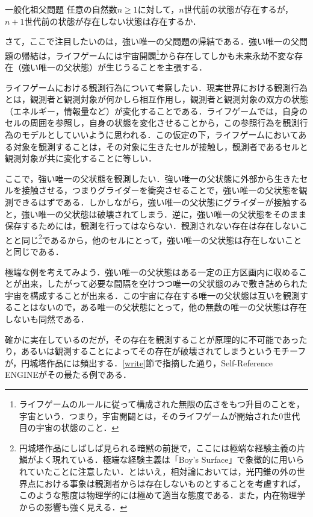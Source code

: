 \documentclass[10pt, a5paper, twoside]{ltjsarticle}
\begin{document}
            \begin{prb}{一般化祖父問題}{}
                任意の自然数$n \geq 1$に対して，$n$世代前の状態が存在するが，$n+1$世代前の状態が存在しない状態は存在するか．
            \end{prb}

            さて，ここで注目したいのは，強い唯一の父問題の帰結である．強い唯一の父問題の帰結は，ライフゲームには宇宙開闢\footnote{ライフゲームのルールに従って構成された無限の広さをもつ升目のことを，宇宙という．つまり，宇宙開闢とは，そのライフゲームが開始された0世代目の宇宙の状態のこと．}から存在してしかも未来永劫不変な存在（強い唯一の父状態）が生じうることを主張する．

            ライフゲームにおける観測行為について考察したい．現実世界における観測行為とは，観測者と観測対象が何かしら相互作用し，観測者と観測対象の双方の状態（エネルギー，情報量など）が変化することである．ライフゲームでは，自身のセルの周囲を参照し，自身の状態を変化させることから，この参照行為を観測行為のモデルとしていいように思われる．この仮定の下，ライフゲームにおいてある対象を観測することは，その対象に生きたセルが接触し，観測者であるセルと観測対象が共に変化することに等しい．

            ここで，強い唯一の父状態を観測したい．強い唯一の父状態に外部から生きたセルを接触させる，つまりグライダーを衝突させることで，強い唯一の父状態を観測できるはずである．しかしながら，強い唯一の父状態にグライダーが接触すると，強い唯一の父状態は破壊されてしまう．逆に，強い唯一の父状態をそのまま保存するためには，観測を行ってはならない．観測されない存在は存在しないことと同じ\footnote{円城塔作品にしばしば見られる暗黙の前提で，ここには極端な経験主義の片鱗がよく現れている．極端な経験主義は「Boy's Surface」で象徴的に用いられていたことに注意したい．とはいえ，相対論においては，光円錐の外の世界点における事象は観測者からは存在しないものとすることを考慮すれば，このような態度は物理学的には極めて適当な態度である．また，内在物理学からの影響も強く見える．}であるから，他のセルにとって，強い唯一の父状態は存在しないことと同じである．

            極端な例を考えてみよう．強い唯一の父状態はある一定の正方区画内に収めることが出来，したがって必要な間隔を空けつつ唯一の父状態のみで敷き詰められた宇宙を構成することが出来る．この宇宙に存在する唯一の父状態は互いを観測することはないので，ある唯一の父状態にとって，他の無数の唯一の父状態は存在しないも同然である．

            確かに実在しているのだが，その存在を観測することが原理的に不可能であったり，あるいは観測することによってその存在が破壊されてしまうというモチーフが，円城塔作品には頻出する．\ref{write}節で指摘した通り，Self-Reference ENGINEがその最たる例である．
\end{document}
